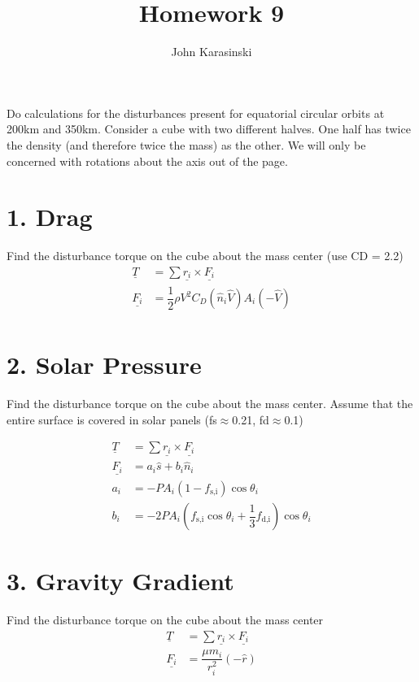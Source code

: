 \documentclass[onecolumn,10pt]{jhwhw}
\author{John Karasinski}
\title{Homework 9}
\begin{document}

Do calculations for the disturbances present for equatorial circular orbits at 200km and 350km. Consider a cube with two different halves. One half has twice the density (and therefore twice the mass) as the other. We will only be concerned with rotations about the axis out of the page.

\part{1. Drag}
Find the disturbance torque on the cube about the mass center (use CD = 2.2)
\begin{align*}
\underline{T} &= \sum \underline{r_i} \times \underline{F_i} \\
\underline{F_i} &= \dfrac{1}{2} \rho V^2 C_D \left( \hat{n}_i \hat{V} \right) A_i \left( - \hat{V} \right) \\
\end{align*}

\part{2. Solar Pressure}
Find the disturbance torque on the cube about the mass center. Assume that the entire surface is covered in solar panels (fs$\approx$0.21, fd$\approx$0.1)

\begin{align*}
\underline{T} &= \sum \underline{r_i} \times \underline{F_i} \\
\underline{F_i} &= a_i \hat{s} + b_i \hat{n}_i \\
a_i &= -PA_i \left(1-f_{\mbox{s,i}} \right) \cos{\theta_i} \\
b_i &= -2PA_i \left(f_{\mbox{s,i}} \cos{\theta_i} + \dfrac{1}{3} f_{\mbox{d,i}} \right) \cos{\theta_i}
\end{align*}

\part{3. Gravity Gradient}
Find the disturbance torque on the cube about the mass center
\begin{align*}
\underline{T} &= \sum \underline{r_i} \times \underline{F_i} \\
\underline{F_i} &= \dfrac{\mu m_i}{r_i^2} \left(- \hat{r} \right) \\
\end{align*}
\end{document}
